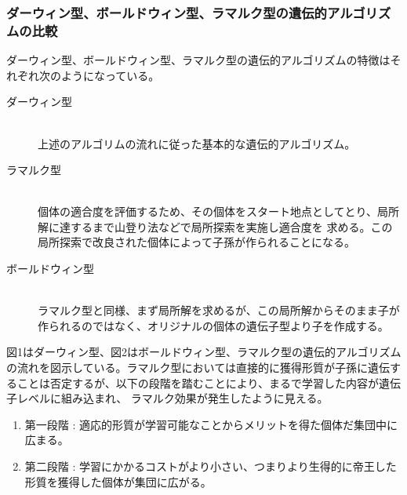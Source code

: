 \documentclass[uplatex]{jsarticle}
\begin{document}
\subsubsection{ダーウィン型、ボールドウィン型、ラマルク型の遺伝的アルゴリズムの比較}
ダーウィン型、ボールドウィン型、ラマルク型の遺伝的アルゴリズムの特徴はそれぞれ次のようになっている。
\begin{description}
  \item[ダーウィン型]\mbox{}\\
  上述のアルゴリムの流れに従った基本的な遺伝的アルゴリズム。
  \item[ラマルク型]\mbox{}\\
  個体の適合度を評価するため、その個体をスタート地点としてとり、局所解に達するまで山登り法などで局所探索を実施し適合度を
  求める。この局所探索で改良された個体によって子孫が作られることになる。
  \item[ボールドウィン型]\mbox{}\\
  ラマルク型と同様、まず局所解を求めるが、この局所解からそのまま子が作られるのではなく、オリジナルの個体の遺伝子型より子を作成する。
\end{description}
図1はダーウィン型、図2はボールドウィン型、ラマルク型の遺伝的アルゴリズムの流れを図示している。ラマルク型においては直接的に獲得形質が子孫に遺伝することは否定するが、以下の段階を踏むことにより、まるで学習した内容が遺伝子レベルに組み込まれ、
ラマルク効果が発生したように見える。
\begin{enumerate}
  \item 第一段階 : 適応的形質が学習可能なことからメリットを得た個体だ集団中に広まる。
  \item 第二段階 : 学習にかかるコストがより小さい、つまりより生得的に帝王した形質を獲得した個体が集団に広がる。
\end{enumerate}
\end{document}
